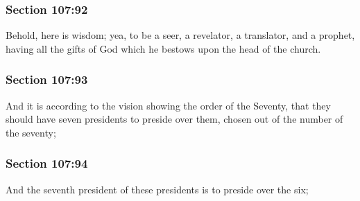 	\subsubsection{Section 107:92} %
		\label{DC107-92}

		Behold, here is wisdom; yea, to be a seer, a revelator, a translator, and a prophet, having all the gifts of God which he bestows upon the head of the church.


	\subsubsection{Section 107:93} %
		\label{DC107-93}

		And it is according to the vision showing the order of the Seventy, that they should have seven presidents to preside over them, chosen out of the number of the seventy;


	\subsubsection{Section 107:94} %
		\label{DC107-94}

		And the seventh president of these presidents is to preside over the six;


